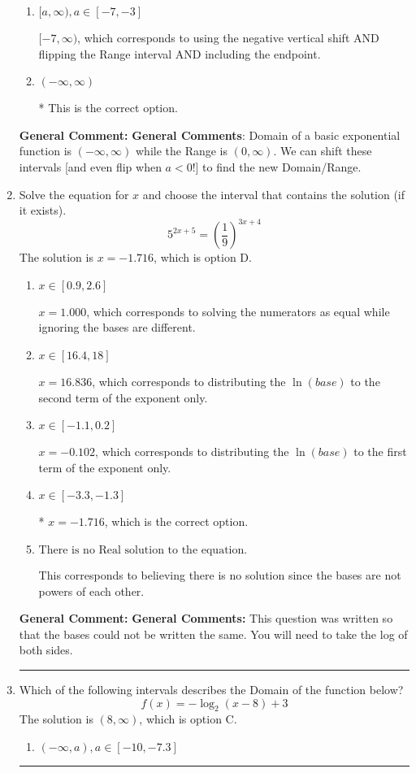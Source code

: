 \documentclass{extbook}[14pt]
\newcommand{\litem}[1]{\item #1

\rule{\textwidth}{0.4pt}}
\begin{document}
\begin{enumerate}
{\begin{enumerate}[label=\Alph*.]
$(-7, \infty)$, which corresponds to using the negative vertical shift AND flipping the Range interval.
\item \( [a, \infty), a \in [-7, -3] \)

$[-7, \infty)$, which corresponds to using the negative vertical shift AND flipping the Range interval AND including the endpoint.
\item \( (-\infty, \infty) \)

* This is the correct option.
\end{enumerate}

\textbf{General Comment:} \textbf{General Comments}: Domain of a basic exponential function is $(-\infty, \infty)$ while the Range is $(0, \infty)$. We can shift these intervals [and even flip when $a<0$!] to find the new Domain/Range.
}
\litem{
Solve the equation for $x$ and choose the interval that contains the solution (if it exists).
\[ 5^{2x+5} = \left(\frac{1}{9}\right)^{3x+4} \]The solution is \( x = -1.716 \), which is option D.\begin{enumerate}[label=\Alph*.]
\item \( x \in [0.9, 2.6] \)

$x = 1.000$, which corresponds to solving the numerators as equal while ignoring the bases are different.
\item \( x \in [16.4, 18] \)

$x = 16.836$, which corresponds to distributing the $\ln(base)$ to the second term of the exponent only.
\item \( x \in [-1.1, 0.2] \)

$x = -0.102$, which corresponds to distributing the $\ln(base)$ to the first term of the exponent only.
\item \( x \in [-3.3, -1.3] \)

* $x = -1.716$, which is the correct option.
\item \( \text{There is no Real solution to the equation.} \)

This corresponds to believing there is no solution since the bases are not powers of each other.
\end{enumerate}

\textbf{General Comment:} \textbf{General Comments:} This question was written so that the bases could not be written the same. You will need to take the log of both sides.
}
\litem{
Which of the following intervals describes the Domain of the function below?
\[ f(x) = -\log_2{(x-8)}+3 \]The solution is \( (8, \infty) \), which is option C.\begin{enumerate}[label=\Alph*.]
\item \( (-\infty, a), a \in [-10, -7.3] \)


\end{enumerate}}
\end{enumerate}
\end{document}
